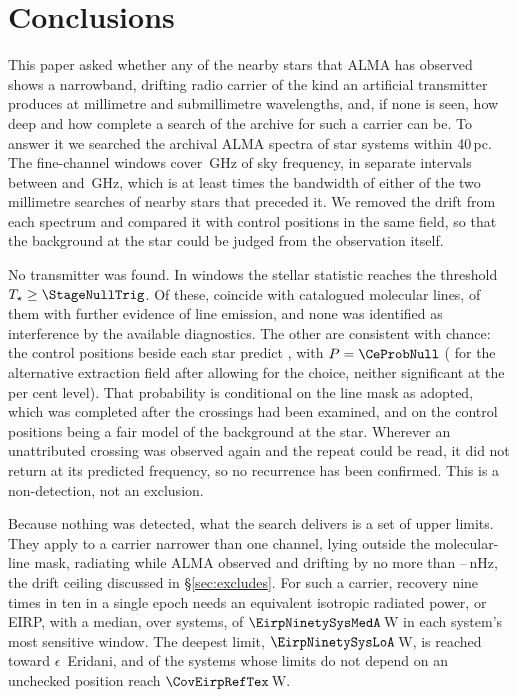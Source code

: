 \section{Conclusions}
\label{sec:conclusions}

This paper asked whether any of the nearby stars that ALMA has observed shows
a narrowband, drifting radio carrier of the kind an artificial transmitter
produces at millimetre and submillimetre wavelengths, and, if none is
seen, how deep and how complete a search of the archive for such a carrier
can be. To answer it we searched the archival ALMA spectra of
\NSysClassA{} star systems within 40\,pc. The fine-channel windows cover
\CvUnionA\,GHz of sky frequency, in \CovNIslands{} separate intervals between
\SurvFreqLoA{} and \SurvFreqHiA\,GHz, which is at least \SbPriorRatio{} times
the bandwidth of either of the two millimetre searches of nearby stars that
preceded it. We removed the drift from
each spectrum and compared it with control positions in the same field, so
that the background at the star could be judged from the observation itself.

No transmitter was found. In \CsNCross{} windows the stellar statistic reaches
the threshold $T_\star\geq\StageNullTrig$. Of these, \MkNCoinc{} coincide with
catalogued molecular lines, \LnAttrSupp{} of them with further evidence of
line emission, and none was identified as interference by the available
diagnostics. The other \CeObs{} are consistent with chance: the
control positions beside each star predict \CeExp, with $P=\CeProbNull$
(\FrTwoTrialP{} for the alternative extraction field after allowing for the
choice, neither significant at the \CeAlphaPct{} per cent level). That
probability is conditional on the line mask as adopted, which was completed
after the crossings had been examined, and on the control positions being a
fair model of the background at the star. Wherever an unattributed crossing
was observed again and the repeat could be read, it did not return at its
predicted frequency, so no recurrence has been confirmed. This is a
non-detection, not an exclusion.

Because nothing was detected, what the search delivers is a set of upper
limits. They apply to a carrier narrower than one channel, lying outside the
molecular-line mask, radiating while ALMA observed and drifting by no more
than \DriftCeilLo--\DriftCeilHi\,nHz, the drift ceiling discussed in
\S\ref{sec:excludes}. For such a carrier, recovery nine times in ten in a single epoch needs an equivalent
isotropic radiated power, or EIRP, with a median, over systems, of
$\EirpNinetySysMedA$\,W in each system's most sensitive window. The deepest
limit, $\EirpNinetySysLoA$\,W, is reached toward $\epsilon$~Eridani, and
\NSysEfifteen{} of the \NSysALimSum{} systems whose limits do not depend on an
unchecked position reach $\CovEirpRefTex$\,W.

